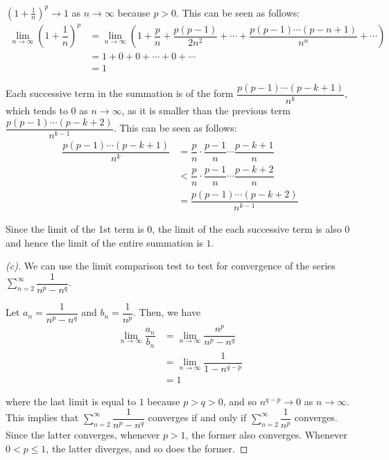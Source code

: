 \documentclass{article}
\begin{document}
\begin{remark*}
    $\left( 1 + \frac{1}{n} \right)^p \to 1$ as $n \to \infty$ because $p > 0$. This can be seen as follows:
    \begin{align*}
        \lim\limits_{n \to \infty} \left( 1 + \dfrac{1}{n} \right)^p 
        &= \lim\limits_{n \to \infty} \left( 1 + \dfrac{p}{n} + \dfrac{p(p-1)}{2n^2} + \cdots + \dfrac{p(p-1)\cdots(p-n+1)}{n^n} + \cdots \right) \\
        &= 1 + 0 + 0 + \cdots + 0 + \cdots \\
        &= 1
    \end{align*}


    Each successive term in the summation is of the form $\dfrac{p(p-1)\cdots(p-k+1)}{n^k}$, which tends to $0$ as $n \to \infty$, as it is smaller than the previous term $\dfrac{p(p-1)\cdots(p-k+2)}{n^{k-1}}$. This can be seen as follows:
    \begin{align*}
        \dfrac{p(p-1)\cdots(p-k+1)}{n^k} 
        &= \dfrac{p}{n} \cdot \dfrac{p-1}{n} \cdots \dfrac{p-k+1}{n} \\
        &< \dfrac{p}{n} \cdot \dfrac{p-1}{n} \cdots \dfrac{p-k+2}{n} \\
        &= \dfrac{p(p-1)\cdots(p-k+2)}{n^{k-1}}
    \end{align*}

    Since the limit of the 1st term is $0$, the limit of the each successive term is also $0$ and hence the limit of the entire summation is $1$.
\end{remark*}

\clearpage

\begin{proof}[(c)]
    We can use the limit comparison test to test for convergence of the series $\displaystyle\sum_{n=2}^{\infty} \dfrac{1}{n^p - n^q}$.

    Let $a_n = \dfrac{1}{n^p - n^q}$ and $b_n = \dfrac{1}{n^p}$. Then, we have
    \begin{align*}
        \lim\limits_{n \to \infty} \dfrac{a_n}{b_n} 
        &= \lim\limits_{n \to \infty} \dfrac{n^p}{n^p - n^q} \\
        &= \lim\limits_{n \to \infty} \dfrac{1}{1 - n^{q-p}} \\
        &= 1
    \end{align*}

    where the last limit is equal to $1$ because $p > q > 0$, and so $n^{q-p} \to 0$ as $n \to \infty$. \\

    This implies that $\displaystyle\sum_{n=2}^{\infty} \dfrac{1}{n^p - n^q}$ converges if and only if $\displaystyle\sum_{n=2}^{\infty} \dfrac{1}{n^p}$ converges. Since the latter converges, whenever $p > 1$, the former also converges. Whenever $0 < p \leq 1$, the latter diverges, and so does the former.
\end{proof}
\end{document}
